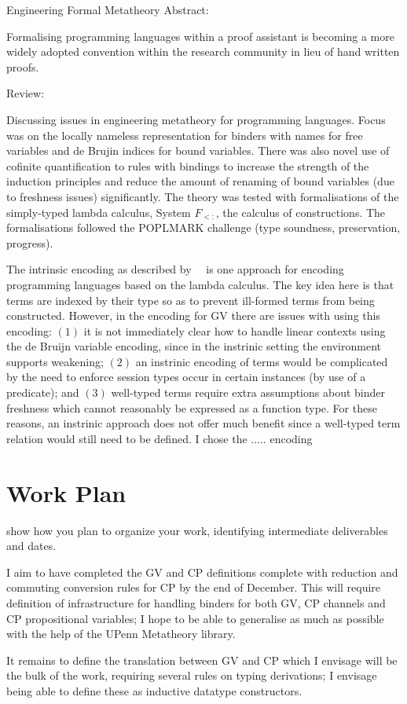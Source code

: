 \documentclass{mprop}
\begin{document}
Engineering Formal Metatheory
Abstract:

Formalising programming languages within a proof assistant is becoming a
more widely adopted convention within the research community in lieu of hand
written proofs.

Review:

Discussing issues in engineering metatheory for programming languages.
Focus was on the locally nameless representation for binders with names
for free variables and de Brujin indices for bound variables. There was
also novel use of cofinite quantification to rules with bindings to increase
the strength of the induction principles and reduce the amount of renaming
of bound variables (due to freshness issues) significantly. The theory was
tested with formalisations of the simply-typed lambda calculus,
System $F_{<:}$,
the calculus of constructions. The formalisations followed the POPLMARK
challenge (type soundness, preservation, progress).


The intrinsic encoding as described by~\citeauthor{Benton:2012:STT}~\cite{Benton:2012:STT} is one approach for encoding programming languages based on the lambda calculus. The key idea here is that terms are indexed by their type so as to prevent ill-formed terms from being constructed. However, in the encoding for GV there are issues with using this encoding: $(1)$ it is not immediately clear how to handle linear contexts using the de Bruijn variable encoding, since in the instrinic setting the environment supports weakening; $(2)$ an instrinic encoding of terms would be complicated by the need to enforce session types occur in certain instances (by use of a predicate); and $(3)$ well-typed terms require extra assumptions about binder freshness which cannot reasonably be expressed as a function type. For these reasons, an instrinic approach does not offer much benefit since a well-typed term relation would still need to be defined. I chose the ..... encoding


\section{Work Plan}

show how you plan to organize your work, identifying intermediate deliverables
and dates.

I aim to have completed the GV and CP definitions complete with reduction and commuting conversion rules for CP by the end of December. This will require definition of infrastructure for handling binders for both GV, CP channels and CP propositional variables; I hope to be able to generalise as much as possible with the help of the UPenn Metatheory library.

It remains to define the translation between GV and CP which I envisage will be the bulk of the work, requiring several rules on typing derivations; I envisage being able to define these as inductive datatype constructors.


\printbibliography
\end{document}
